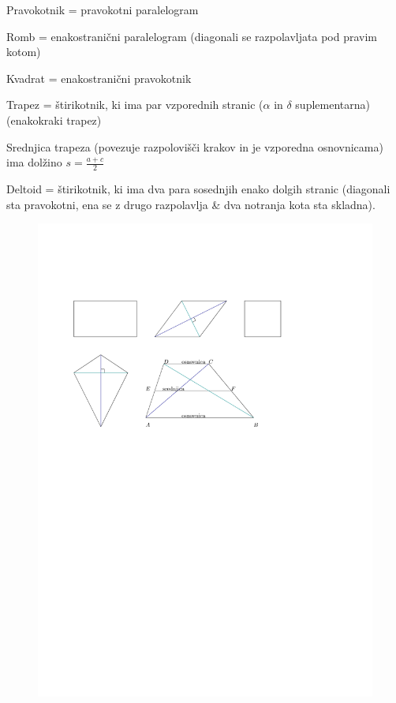 \documentclass{article}
\begin{document}
Pravokotnik = pravokotni paralelogram

Romb = enakostranični paralelogram (diagonali se razpolavljata pod pravim kotom)

Kvadrat = enakostranični pravokotnik

Trapez = štirikotnik, ki ima par vzporednih stranic ($\alpha$ in $\delta$ suplementarna) (enakokraki trapez)

Srednjica trapeza (povezuje razpolovišči krakov in je vzporedna osnovnicama) ima dolžino $s=\frac{a+c}{2}$

Deltoid = štirikotnik, ki ima dva para sosednjih enako dolgih stranic (diagonali sta pravokotni, ena se z drugo razpolavlja \& dva notranja kota sta skladna).

\begin{figure}[H]
    \includegraphics[width=1\textwidth]{liki.pdf}
    \centering
\end{figure}
\end{document}

